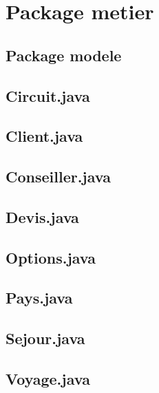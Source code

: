\documentclass[11pt]{article}
\begin{document}
\section{Package metier}
\subsection{Package modele}

\subsection*{Circuit.java}

\newpage

\subsection*{Client.java}

\newpage

\subsection*{Conseiller.java}

\newpage

\subsection*{Devis.java}

\newpage

\subsection*{Options.java}

\newpage

\subsection*{Pays.java}

\newpage

\subsection*{Sejour.java}

\newpage

\subsection*{Voyage.java}

\newpage
\end{document}

